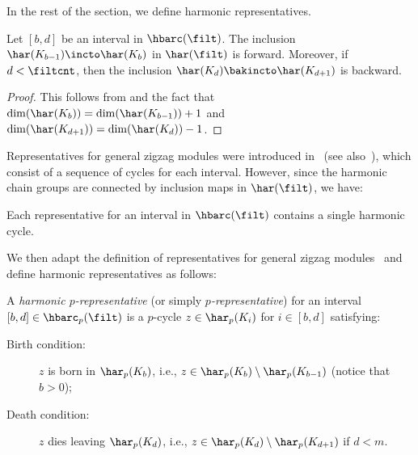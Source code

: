 In the rest of the section, we define harmonic representatives.
\begin{proposition}
Let $[b,d]$ be an interval in $\hbarc(\filt)$.
The inclusion $\har(K_{b-1}) \incto \har(K_b)$ in $\har(\filt)$
is forward.
Moreover, if $d<\filtcnt$,
then the inclusion $\har(K_{d}) \bakincto \har(K_{d+1})$ is backward.
\end{proposition}
\begin{proof}
This follows from  and the fact that 
$\dim(\har(K_{b}))=\dim(\har(K_{b-1}))+1$ 
and
$\dim(\har(K_{d+1}))=\dim(\har(K_{d}))-1$.
\end{proof}

Representatives for general zigzag modules were introduced in~\cite{BendichPaul2013Haro,maria2015zigzag} (see also~\cite{zzrep}),
which consist of a sequence of cycles
for each interval.
However, since the harmonic chain groups are connected by inclusion maps in $\har(\filt)$,
we have:
\begin{proposition}\label{prop:single-rep}
Each representative for an interval in $\hbarc(\filt)$
contains a single harmonic cycle.
\end{proposition}

We then adapt the definition of representatives for
general zigzag modules~\cite{zzrep,maria2015zigzag} and 
define
harmonic representatives as follows:
\begin{definition}\label{dfn:rep}
A \emph{harmonic $p$-representative}
{\rm(}or simply \emph{$p$-representative}{\rm)}
for an interval $[b,d]\in\hbarc_p(\filt)$ is a $p$-cycle 
$z\in\har_p(K_i)$ for $i\in[b,d]$ satisfying:
\begin{description}
\item[Birth condition:] $z$ is born in $\har_p(K_{b})$, i.e., $z\in\har_p(K_{b})\setminus\har_p(K_{b-1})$ {\rm(}notice that $b>0${\rm);}
\item[Death condition:] $z$ dies leaving $\har_p(K_{d})$, i.e., $z\in\har_p(K_{d})\setminus\har_p(K_{d+1})$ if $d<m$.
\end{description}
\end{definition}

